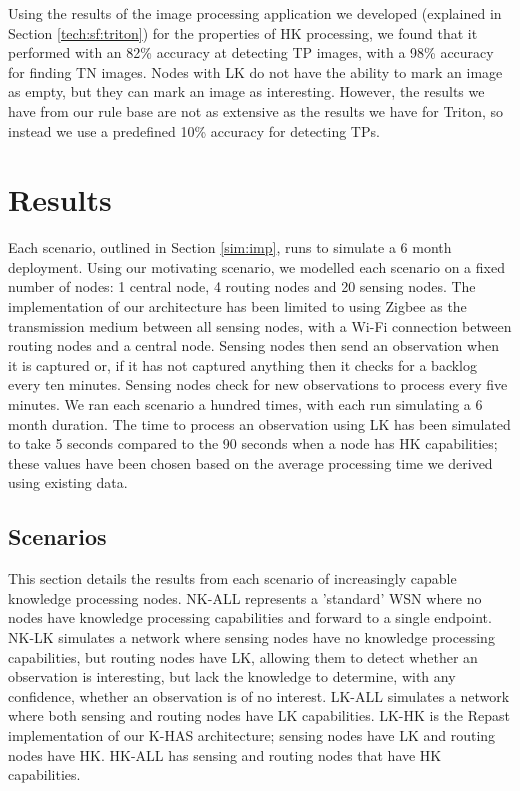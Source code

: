 	Using the results of the image processing application we developed (explained in Section \ref{tech:sf:triton}) for the properties of HK processing, we found that it performed with an 82\% accuracy at detecting TP images, with a 98\% accuracy for finding TN images. Nodes with LK do not have the ability to mark an image as empty, but they can mark an image as interesting. However, the results we have from our rule base are not as extensive as the results we have for Triton, so instead we use a predefined 10\% accuracy for detecting TPs.
	

\section{Results}
Each scenario, outlined in Section \ref{sim:imp}, runs to simulate a 6 month deployment. Using our motivating scenario, we modelled each scenario on a fixed number of nodes: 1 central node, 4 routing nodes and 20 sensing nodes. The implementation of our architecture has been limited to using Zigbee as the transmission medium between all sensing nodes, with a Wi-Fi connection between routing nodes and a central node. Sensing nodes then send an observation when it is captured or, if it has not captured anything then it checks for a backlog every ten minutes. Sensing nodes check for new observations to process every five minutes. We ran each scenario a hundred times, with each run simulating a 6 month duration. The time to process an observation using LK has been simulated to take 5 seconds compared to the 90 seconds when a node has HK capabilities; these values have been chosen based on the average processing time we derived using existing data.

\subsection{Scenarios}

This section details the results from each scenario of increasingly capable knowledge processing nodes. NK-ALL represents a 'standard' WSN where no nodes have knowledge processing capabilities and forward to a single endpoint. NK-LK simulates a network where sensing nodes have no knowledge processing capabilities, but routing nodes have LK, allowing them to detect whether an observation is interesting, but lack the knowledge to determine, with any confidence, whether an observation is of no interest. LK-ALL simulates a network where both sensing and routing nodes have LK capabilities. LK-HK is the Repast implementation of our K-HAS architecture; sensing nodes have LK and routing nodes have HK. HK-ALL has sensing and routing nodes that have HK capabilities. 

